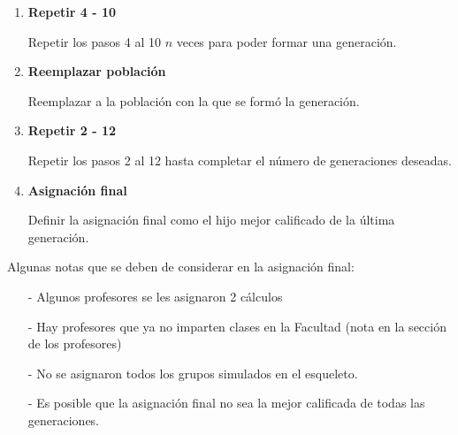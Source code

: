 \begin{enumerate}
\item \textbf{Repetir 4 - 10}

Repetir los pasos 4 al 10 $n$ veces para poder formar una generación.

\item \textbf{Reemplazar población}

Reemplazar a la población con la que se formó la generación.

\item \textbf{Repetir 2 - 12}

Repetir los pasos 2 al 12 hasta completar el número de generaciones deseadas.

\item \textbf{Asignación final}

Definir la asignación final como el hijo mejor calificado de la última generación.
\end{enumerate}


Algunas notas que se deben de considerar en la asignación final:

\begin{itemize}
\item[-] Algunos profesores se les asignaron 2 cálculos

\item[-] Hay profesores que ya no imparten clases en la Facultad (nota en la sección de los profesores)

\item[-] No se asignaron todos los grupos simulados en el esqueleto.

\item[-] Es posible que la asignación final no sea la mejor calificada de todas las generaciones.
\end{itemize}


